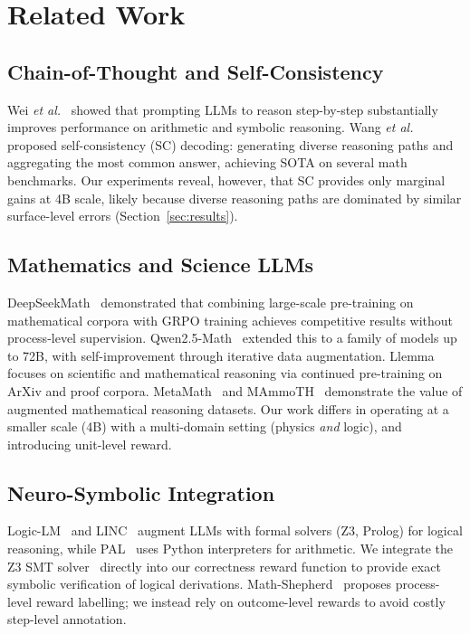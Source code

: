 \documentclass{ieeeaccess}
\begin{document}
\section{Related Work}
\label{sec:related}

\subsection{Chain-of-Thought and Self-Consistency}

Wei \emph{et al.}~\cite{Wei2022} showed that prompting LLMs to reason
step-by-step substantially improves performance on arithmetic and symbolic
reasoning.
Wang \emph{et al.}~\cite{Wang2023sc} proposed self-consistency (SC) decoding:
generating diverse reasoning paths and aggregating the most common answer,
achieving SOTA on several math benchmarks.
Our experiments reveal, however, that SC provides only marginal gains
at 4B scale, likely because diverse reasoning paths are dominated by similar
surface-level errors (Section~\ref{sec:results}).

\subsection{Mathematics and Science LLMs}

DeepSeekMath~\cite{Shao2024} demonstrated that combining large-scale
pre-training on mathematical corpora with GRPO training achieves
competitive results without process-level supervision.
Qwen2.5-Math~\cite{Yang2024} extended this to a family of models up to 72B,
with self-improvement through iterative data augmentation.
Llemma~\cite{Azerbayev2024} focuses on scientific and mathematical reasoning
via continued pre-training on ArXiv and proof corpora.
MetaMath~\cite{Yu2023} and MAmmoTH~\cite{Yue2023} demonstrate the value
of augmented mathematical reasoning datasets.
Our work differs in operating at a smaller scale (4B) with a multi-domain
setting (physics \emph{and} logic), and introducing unit-level reward.

\subsection{Neuro-Symbolic Integration}

Logic-LM~\cite{Pan2023} and LINC~\cite{Olausson2023} augment LLMs with
formal solvers (Z3, Prolog) for logical reasoning, while PAL~\cite{Gao2022}
uses Python interpreters for arithmetic.
We integrate the Z3 SMT solver~\cite{Pan2023} directly into our correctness
reward function to provide exact symbolic verification of logical derivations.
Math-Shepherd~\cite{Wang2024mathshepherd} proposes process-level reward
labelling; we instead rely on outcome-level rewards to avoid costly
step-level annotation.
\end{document}
